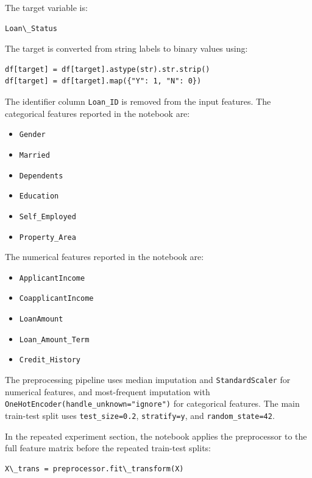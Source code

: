The target variable is:

\begin{verbatim}
Loan\_Status
\end{verbatim}

The target is converted from string labels to binary values using:

\begin{verbatim}
df[target] = df[target].astype(str).str.strip()
df[target] = df[target].map({"Y": 1, "N": 0})
\end{verbatim}

The identifier column \texttt{Loan\_ID} is removed from the input features. The categorical features reported in the notebook are:

\begin{itemize}
    \item \texttt{Gender}
    \item \texttt{Married}
    \item \texttt{Dependents}
    \item \texttt{Education}
    \item \texttt{Self\_Employed}
    \item \texttt{Property\_Area}
\end{itemize}

The numerical features reported in the notebook are:

\begin{itemize}
    \item \texttt{ApplicantIncome}
    \item \texttt{CoapplicantIncome}
    \item \texttt{LoanAmount}
    \item \texttt{Loan\_Amount\_Term}
    \item \texttt{Credit\_History}
\end{itemize}

The preprocessing pipeline uses median imputation and \texttt{StandardScaler} for numerical features, and most-frequent imputation with \texttt{OneHotEncoder(handle\_unknown="ignore")} for categorical features. The main train-test split uses \texttt{test\_size=0.2}, \texttt{stratify=y}, and \texttt{random\_state=42}.

In the repeated experiment section, the notebook applies the preprocessor to the full feature matrix before the repeated train-test splits:

\begin{verbatim}
X\_trans = preprocessor.fit\_transform(X)
\end{verbatim}

